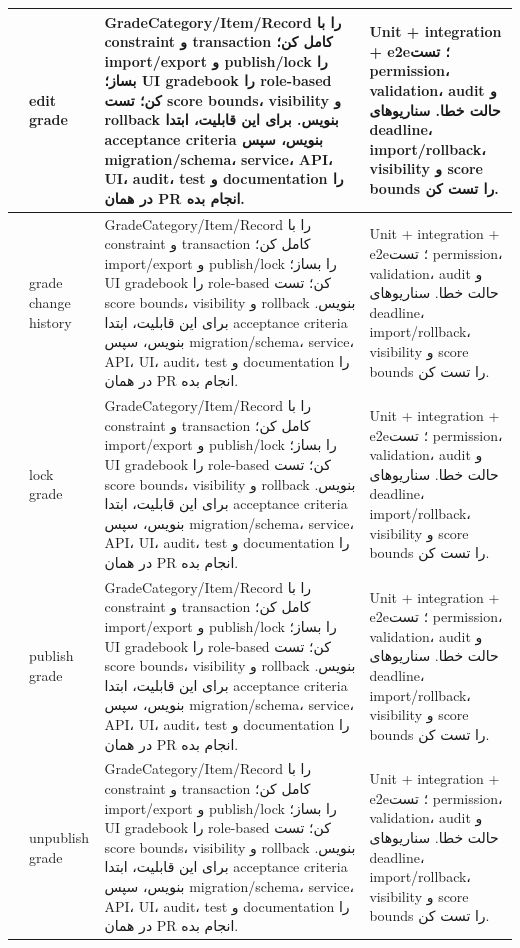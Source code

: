 \documentclass[11pt,a4paper]{article}
\begin{document}
\begin{longtable}{|>{\raggedleft\arraybackslash}p{}|>{\raggedleft\arraybackslash}p{}|>{\raggedleft\arraybackslash}p{}|>{\raggedleft\arraybackslash}p{}|}
125 & edit grade & GradeCategory/Item/Record را با constraint و transaction کامل کن؛ import/export و publish/lock را بساز؛ UI gradebook را role-based کن؛ تست score bounds، visibility و rollback بنویس. برای این قابلیت، ابتدا acceptance criteria بنویس، سپس migration/schema، service، API، UI، audit، test و documentation را در همان PR انجام بده. & Unit + integration + e2e؛ تست permission، validation، audit و حالت خطا. سناریوهای deadline، import/rollback، visibility و score bounds را تست کن. \\ \hline
126 & grade change history & GradeCategory/Item/Record را با constraint و transaction کامل کن؛ import/export و publish/lock را بساز؛ UI gradebook را role-based کن؛ تست score bounds، visibility و rollback بنویس. برای این قابلیت، ابتدا acceptance criteria بنویس، سپس migration/schema، service، API، UI، audit، test و documentation را در همان PR انجام بده. & Unit + integration + e2e؛ تست permission، validation، audit و حالت خطا. سناریوهای deadline، import/rollback، visibility و score bounds را تست کن. \\ \hline
127 & lock grade & GradeCategory/Item/Record را با constraint و transaction کامل کن؛ import/export و publish/lock را بساز؛ UI gradebook را role-based کن؛ تست score bounds، visibility و rollback بنویس. برای این قابلیت، ابتدا acceptance criteria بنویس، سپس migration/schema، service، API، UI، audit، test و documentation را در همان PR انجام بده. & Unit + integration + e2e؛ تست permission، validation، audit و حالت خطا. سناریوهای deadline، import/rollback، visibility و score bounds را تست کن. \\ \hline
128 & publish grade & GradeCategory/Item/Record را با constraint و transaction کامل کن؛ import/export و publish/lock را بساز؛ UI gradebook را role-based کن؛ تست score bounds، visibility و rollback بنویس. برای این قابلیت، ابتدا acceptance criteria بنویس، سپس migration/schema، service، API، UI، audit، test و documentation را در همان PR انجام بده. & Unit + integration + e2e؛ تست permission، validation، audit و حالت خطا. سناریوهای deadline، import/rollback، visibility و score bounds را تست کن. \\ \hline
129 & unpublish grade & GradeCategory/Item/Record را با constraint و transaction کامل کن؛ import/export و publish/lock را بساز؛ UI gradebook را role-based کن؛ تست score bounds، visibility و rollback بنویس. برای این قابلیت، ابتدا acceptance criteria بنویس، سپس migration/schema، service، API، UI، audit، test و documentation را در همان PR انجام بده. & Unit + integration + e2e؛ تست permission، validation، audit و حالت خطا. سناریوهای deadline، import/rollback، visibility و score bounds را تست کن. \\ \hline

\end{longtable}
\end{document}
